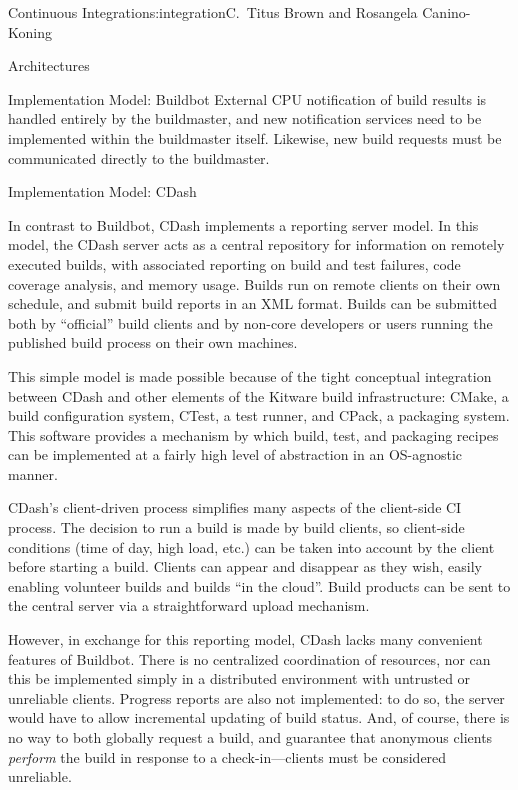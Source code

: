 \begin{aosachapter}{Continuous Integration}{s:integration}{C.\ Titus Brown and Rosangela Canino-Koning}
\begin{aosasect1}{Architectures}
\begin{aosasect2}{Implementation Model: Buildbot}
External CPU notification of build results is handled entirely by the
buildmaster, and new notification services need to be implemented
within the buildmaster itself. Likewise, new build requests must be
communicated directly to the buildmaster.

\end{aosasect2}

\begin{aosasect2}{Implementation Model: CDash}


In contrast to Buildbot, CDash implements a reporting server model. In
this model, the CDash server acts as a central repository for
information on remotely executed builds, with associated reporting on
build and test failures, code coverage analysis, and memory
usage. Builds run on remote clients on their own schedule, and submit
build reports in an XML format. Builds can be submitted both by
``official'' build clients and by non-core developers or users running
the published build process on their own machines.

This simple model is made possible because of the tight conceptual
integration between CDash and other elements of the Kitware build
infrastructure: CMake, a build configuration system, CTest, a test
runner, and CPack, a packaging system. This software provides a
mechanism by which build, test, and packaging recipes can be
implemented at a fairly high level of abstraction in an OS-agnostic
manner.

CDash's client-driven process simplifies many aspects of the
client-side CI process. The decision to run a build is made by build
clients, so client-side conditions (time of day, high load, etc.) can
be taken into account by the client before starting a build. Clients
can appear and disappear as they wish, easily enabling volunteer
builds and builds ``in the cloud''. Build products can be sent to the
central server via a straightforward upload mechanism.

However, in exchange for this reporting model, CDash lacks many
convenient features of Buildbot. There is no centralized coordination
of resources, nor can this be implemented simply in a distributed
environment with untrusted or unreliable clients. Progress reports are
also not implemented: to do so, the server would have to allow
incremental updating of build status. And, of course, there is no way
to both globally request a build, and guarantee that anonymous clients
\emph{perform} the build in response to a check-in---clients must be
considered unreliable.


\end{aosasect2}
\end{aosasect1}
\end{aosachapter}
